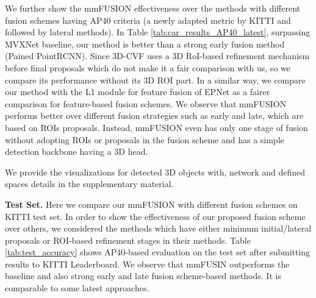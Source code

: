 \documentclass[10pt,twocolumn,letterpaper]{article}
\begin{document}
We further show the mmFUSION effectiveness over the methods with different fusion schemes having AP40 criteria (a newly adapted metric by KITTI and followed by lateral methods). In Table \ref{tab:car_results_AP40_latest}, surpassing MVXNet baseline, our method is better than a strong early fusion method (Pained PointRCNN). Since 3D-CVF uses a 3D RoI-based refinement mechanism before final proposals which do not make it a fair comparison with us, so we compare its performance without its 3D ROI part. In a similar way, we compare our method with the L1 module for feature fusion of EPNet as a fairer comparison for feature-based fusion schemes. We observe that mmFUSION performs better over different fusion strategies such as early and late, which are based on ROIs proposals.
Instead, mmFUSION even has only one stage of fusion without adopting ROIs or proposals in the fusion scheme and has a simple detection backbone having a 3D head. 

We provide the visualizations for detected 3D objects with, network and defined spaces details in the supplementary material.

\textbf{Test Set.}
Here we compare our mmFUSION with different fusion schemes on KITTI test set.  In order to show the effectiveness of our proposed fusion scheme over others, we considered the methods which have either minimum initial/lateral proposals or ROI-based refinement stages in their methods. Table \ref{tab:test_accuracy} shows AP40-based evaluation on the test set after submitting results to KITTI Leaderboard. We observe that mmFUSIN outperforms the baseline and also strong early and late fusion scheme-based methods. It is comparable to some latest approaches. 

\end{document}
